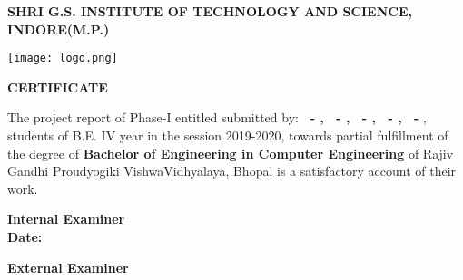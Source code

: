 \pagestyle{plain}
\large
\begin{center}
    


\textbf{SHRI G.S. INSTITUTE OF TECHNOLOGY AND SCIENCE, INDORE(M.P.)\\}

\vspace*{0.7cm}

\texttt{[image: logo.png]}

\vspace*{0.7cm}
\normalfont\LARGE\centering
\textbf{CERTIFICATE} \\
\end{center}
\normalsize
The project report of Phase-I entitled \emph{\textbf{\projectTitle}} submitted by:
\textbf{
\rollA\ - \nameA,
\rollB\ - \nameB,
\rollC\ - \nameC,
\rollD\ - \nameD,
\rollE\ - \nameE},
students of B.E. IV year in the session 2019-2020, towards partial fulfillment of the degree of \textbf{Bachelor of Engineering in Computer Engineering} of Rajiv Gandhi Proudyogiki VishwaVidhyalaya, Bhopal is a satisfactory account of their work.



\begin{minipage}[t]{0.45\textwidth}
    \flushleft
    \vspace*{3cm}
    \large
    \textbf{Internal Examiner\\}
    \vspace*{1.5cm}
    \textbf{Date:}
\end{minipage}
\hfill
\begin{minipage}[t]{0.45\textwidth}
    \flushleft
    \vspace*{3cm}
    \large
    \textbf{External Examiner}
  
\end{minipage}